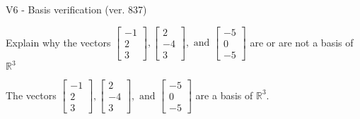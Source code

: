 \begin{exercise}
  \begin{exerciseTitle}V6 - Basis verification (ver. 837)\end{exerciseTitle}
  \begin{exerciseStatement}
    Explain why the vectors \(\left[\begin{array}{r}
-1 \\
2 \\
3
\end{array}\right] , \left[\begin{array}{r}
2 \\
-4 \\
3
\end{array}\right] , \text{ and } \left[\begin{array}{r}
-5 \\
0 \\
-5
\end{array}\right]\) are or are not a basis of \(\mathbb{R}^3\)	


  \end{exerciseStatement}
  \begin{exerciseAnswer}
   The vectors \(\left[\begin{array}{r}
-1 \\
2 \\
3
\end{array}\right] , \left[\begin{array}{r}
2 \\
-4 \\
3
\end{array}\right] , \text{ and } \left[\begin{array}{r}
-5 \\
0 \\
-5
\end{array}\right]\) 
  	 are  a basis of \(\mathbb{R}^3\).
  


  \end{exerciseAnswer}
\end{exercise}